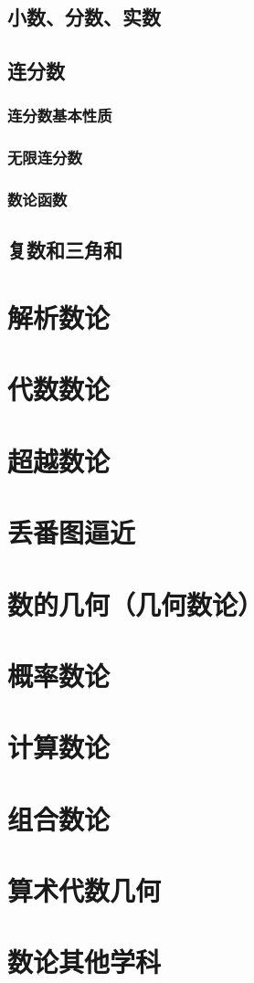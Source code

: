 \documentclass[UTF8]{../09-Mathematics}
\begin{document}
\section{小数、分数、实数}





\section{连分数}

\subsection{连分数基本性质}

\subsection{无限连分数}

\subsection{数论函数}




\section{复数和三角和}




\chapter{解析数论}
\chapter{代数数论}
\chapter{超越数论}
\chapter{丢番图逼近}
\chapter{数的几何（几何数论）}
\chapter{概率数论}
\chapter{计算数论}
\chapter{组合数论}
\chapter{算术代数几何}
\chapter{数论其他学科}
\end{document}
